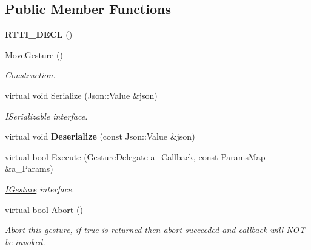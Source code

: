 \subsection*{Public Member Functions}
\begin{DoxyCompactItemize}
\item 
\mbox{\label{class_move_gesture_afac1f8c5640f0df858c09855eb6be148}} 
{\bfseries R\+T\+T\+I\+\_\+\+D\+E\+CL} ()
\item 
\mbox{\label{class_move_gesture_a0a0dd9ec9fa7136664e61d6e362b35d2}} 
\hyperlink{class_move_gesture_a0a0dd9ec9fa7136664e61d6e362b35d2}{Move\+Gesture} ()
\begin{DoxyCompactList}\small\item\em Construction. \end{DoxyCompactList}\item 
\mbox{\label{class_move_gesture_a7c28ba31406a6f613a8968f30fd8ddb3}} 
virtual void \hyperlink{class_move_gesture_a7c28ba31406a6f613a8968f30fd8ddb3}{Serialize} (Json\+::\+Value \&json)
\begin{DoxyCompactList}\small\item\em I\+Serializable interface. \end{DoxyCompactList}\item 
\mbox{\label{class_move_gesture_a643df3eac8209e53fb2af8a1e871941c}} 
virtual void {\bfseries Deserialize} (const Json\+::\+Value \&json)
\item 
\mbox{\label{class_move_gesture_af3b5646e7942018b7b4ea8b0ecb46e69}} 
virtual bool \hyperlink{class_move_gesture_af3b5646e7942018b7b4ea8b0ecb46e69}{Execute} (Gesture\+Delegate a\+\_\+\+Callback, const \hyperlink{class_params_map}{Params\+Map} \&a\+\_\+\+Params)
\begin{DoxyCompactList}\small\item\em \hyperlink{class_i_gesture}{I\+Gesture} interface. \end{DoxyCompactList}\item 
\mbox{\label{class_move_gesture_ab3ae33003e26b88aad830c9e3528a21d}} 
virtual bool \hyperlink{class_move_gesture_ab3ae33003e26b88aad830c9e3528a21d}{Abort} ()
\begin{DoxyCompactList}\small\item\em Abort this gesture, if true is returned then abort succeeded and callback will N\+OT be invoked. \end{DoxyCompactList}\end{DoxyCompactItemize}
